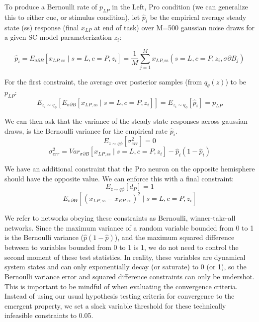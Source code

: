 \documentclass[11pt]{article}
\begin{document}
To produce a Bernoulli rate of $p_{LP}$ in the Left, Pro condition (we can generalize this to either cue, or stimulus condition), let $\hat{p}_i$ be the empirical average steady state (ss) response (final $x_{LP}$ at end of task) over M=500 gaussian noise draws for a given SC model parameterization $z_i$:

\begin{equation}
 \hat{p}_i = E_{\sigma \partial B} \left[ x_{LP,\text{ss}} \mid s=L, c=P, z_i \right] = \frac{1}{M}\sum_{j=1}^M x_{LP,\text{ss}}(s=L, c=P, z_i, \sigma \partial B_j)
 \end{equation}

For the first constraint, the average over posterior samples (from $q_\theta(z)$) to be $p_{LP}$:
\begin{equation}
E_{z_i \sim q_\phi} \left[ E_{\sigma \partial B} \left[ x_{LP,\text{ss}} \mid s=L, c=P, z_i \right] \right] = E_{z_i \sim q_\phi} \left[ \hat{p}_i \right] = p_{LP}
\end{equation}

We can then ask that the variance of the steady state responses across gaussian draws, is the Bernoulli variance for the empirical rate $\hat{p}_i$.
\begin{equation}
E_{z \sim q\phi} \left[ \sigma^2_{err} \right] = 0
\end{equation}
\begin{equation}
\sigma^2_{err} = Var_{\sigma \partial B} \left[ x_{LP,\text{ss}} \mid s=L, c=P, z_i \right] - \hat{p}_i(1 - \hat{p}_i)
\end{equation}

We have an additional constraint that the Pro neuron on the opposite hemisphere should have the opposite value.  We can enforce this with a final constraint:
\begin{equation}
E_{z \sim q\phi} \left[ d_P \right] = 1
\end{equation}
\begin{equation}
E_{\sigma \partial W} \left[ (x_{LP,\text{ss}} - x_{RP,\text{ss}})^2  \mid s=L, c=P, z_i \right]
\end{equation}

We refer to networks obeying these constraints as Bernoulli, winner-take-all networks.  Since the maximum variance of a random variable bounded from 0 to 1 is the Bernoulli variance ($\hat{p}(1-\hat{p})$), and the maximum squared difference between to variables bounded from 0 to 1 is 1, we do not need to control the second moment of these test statistics.  In reality, these variables are dynamical system states and can only exponentially decay (or saturate) to 0 (or 1), so the Bernoulli variance error and squared difference constraints can only be undershot.  This is important to be mindful of when evaluating the convergence criteria.  Instead of using our usual hypothesis testing criteria for convergence to the emergent property, we set a slack variable threshold for these technically infeasible constraints to 0.05.
\end{document}
